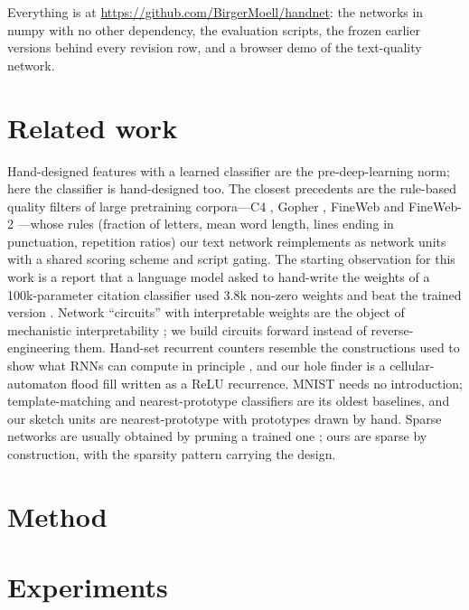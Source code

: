 \documentclass[11pt]{article}
\begin{document}
Everything is at \url{https://github.com/BirgerMoell/handnet}: the networks in
numpy with no other dependency, the evaluation scripts, the frozen earlier
versions behind every revision row, and a browser demo of the text-quality
network.

\section{Related work}
Hand-designed features with a learned classifier are the pre-deep-learning norm; here
the classifier is hand-designed too. The closest precedents are the rule-based quality
filters of large pretraining corpora---C4 \cite{raffel2020t5}, Gopher \cite{rae2021gopher},
FineWeb and FineWeb-2 \cite{penedo2024fineweb,penedo2025fineweb2}---whose rules (fraction
of letters, mean word length, lines ending in punctuation, repetition ratios) our text
network reimplements as network units with a shared scoring scheme and script gating.
The starting observation for this work is a report that a language model asked to
hand-write the weights of a 100k-parameter citation classifier used 3.8k non-zero
weights and beat the trained version \cite{lauritzen2026fable}. Network ``circuits'' with
interpretable weights are the object of mechanistic interpretability \cite{olah2020zoom};
we build circuits forward instead of reverse-engineering them. Hand-set recurrent
counters resemble the constructions used to show what RNNs can compute in principle
\cite{weiss2018counter}, and our hole finder is a cellular-automaton flood fill written
as a ReLU recurrence. MNIST \cite{lecun1998mnist} needs no introduction;
template-matching and nearest-prototype classifiers are its oldest baselines, and our
sketch units are nearest-prototype with prototypes drawn by hand. Sparse networks are
usually obtained by pruning a trained one \cite{frankle2019lottery}; ours are sparse by
construction, with the sparsity pattern carrying the design.

\section{Method}



\section{Experiments}






\end{document}
